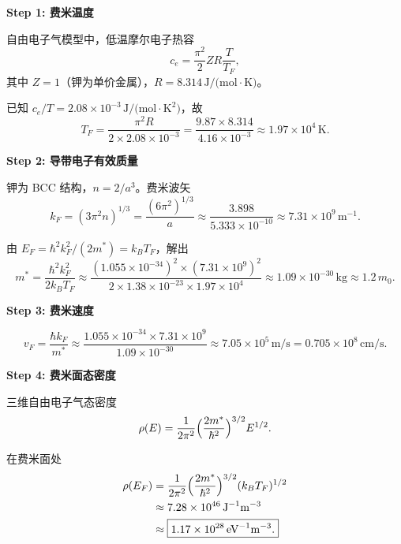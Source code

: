 \begin{derivationbox}[标准解题过程]
\textbf{Step 1: 费米温度}

自由电子气模型中，低温摩尔电子热容
\begin{equation}
c_e=\frac{\pi^2}{2}ZR\frac{T}{T_F},
\end{equation}
其中 $Z=1$（钾为单价金属），$R=8.314\,\text{J/(mol}\cdot\text{K)}$。

已知 $c_e/T=2.08\times10^{-3}\,\text{J/(mol}\cdot\text{K}^2)$，故
\begin{equation}
\boxed{T_F=\frac{\pi^2R}{2\times2.08\times10^{-3}}
=\frac{9.87\times8.314}{4.16\times10^{-3}}
\approx1.97\times10^4\,\text{K}.}
\end{equation}

\textbf{Step 2: 导带电子有效质量}

钾为 BCC 结构，$n=2/a^3$。费米波矢
\begin{equation}
k_F=(3\pi^2n)^{1/3}=\frac{(6\pi^2)^{1/3}}{a}
\approx\frac{3.898}{5.333\times10^{-10}}
\approx7.31\times10^9\,\text{m}^{-1}.
\end{equation}

由 $E_F=\hbar^2k_F^2/(2m^*)=k_BT_F$，解出
\begin{equation}
\boxed{m^*=\frac{\hbar^2k_F^2}{2k_BT_F}
\approx\frac{(1.055\times10^{-34})^2\times(7.31\times10^9)^2}{2\times1.38\times10^{-23}\times1.97\times10^4}
\approx1.09\times10^{-30}\,\text{kg}\approx1.2\,m_0.}
\end{equation}

\textbf{Step 3: 费米速度}

\begin{equation}
\boxed{v_F=\frac{\hbar k_F}{m^*}
\approx\frac{1.055\times10^{-34}\times7.31\times10^9}{1.09\times10^{-30}}
\approx7.05\times10^5\,\text{m/s}=0.705\times10^8\,\text{cm/s}.}
\end{equation}

\textbf{Step 4: 费米面态密度}

三维自由电子气态密度
\begin{equation}
\rho(E)=\frac{1}{2\pi^2}\Bigl(\frac{2m^*}{\hbar^2}\Bigr)^{3/2}E^{1/2}.
\end{equation}

在费米面处
\begin{align}
\rho(E_F)&=\frac{1}{2\pi^2}\Bigl(\frac{2m^*}{\hbar^2}\Bigr)^{3/2}(k_BT_F)^{1/2} \notag\\
&\approx7.28\times10^{46}\,\text{J}^{-1}\text{m}^{-3} \notag\\
&\approx\boxed{1.17\times10^{28}\,\text{eV}^{-1}\text{m}^{-3}.}
\end{align}
\end{derivationbox}

